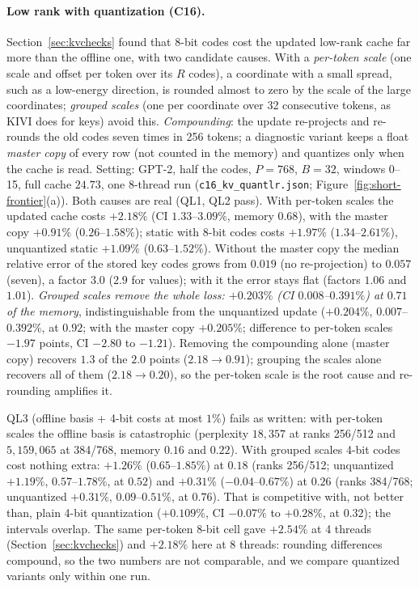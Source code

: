 \documentclass[10pt]{article}
\theoremstyle{plain}
\theoremstyle{definition}
\theoremstyle{remark}
\newcommand{\rl}[1]{\textsf{#1}}%
\begin{document}
\paragraph{Low rank with quantization (C16).} Section~\ref{sec:kvchecks} found that 8-bit codes cost the updated low-rank cache far more than the offline one, with two candidate causes. With a \emph{per-token scale} (one scale and offset per token over its $R$ codes), a coordinate with a small spread, such as a low-energy direction, is rounded almost to zero by the scale of the large coordinates; \emph{grouped scales} (one per coordinate over 32 consecutive tokens, as KIVI \cite{liu2024kivi} does for keys) avoid this. \emph{Compounding}: the update re-projects and re-rounds the old codes seven times in 256 tokens; a diagnostic variant keeps a float \emph{master copy} of every row (not counted in the memory) and quantizes only when the cache is read. Setting: GPT-2, half the codes, $P=768$, $B=32$, windows 0--15, full cache $24.73$, one 8-thread run (\texttt{c16\_kv\_quantlr.json}; Figure~\ref{fig:short-frontier}(a)). Both causes are real (\rl{QL1}, \rl{QL2} pass). With per-token scales the updated cache costs $+2.18\%$ (CI $1.33$--$3.09\%$, memory $0.68$), with the master copy $+0.91\%$ ($0.26$--$1.58\%$); static with 8-bit codes costs $+1.97\%$ ($1.34$--$2.61\%$), unquantized static $+1.09\%$ ($0.63$--$1.52\%$). Without the master copy the median relative error of the stored key codes grows from $0.019$ (no re-projection) to $0.057$ (seven), a factor $3.0$ ($2.9$ for values); with it the error stays flat (factors $1.06$ and $1.01$). \emph{Grouped scales remove the whole loss: $+0.203\%$ (CI $0.008$--$0.391\%$) at $0.71$ of the memory}, indistinguishable from the unquantized update ($+0.204\%$, $0.007$--$0.392\%$, at $0.92$; with the master copy $+0.205\%$; difference to per-token scales $-1.97$ points, CI $-2.80$ to $-1.21$). Removing the compounding alone (master copy) recovers $1.3$ of the $2.0$ points ($2.18\to0.91$); grouping the scales alone recovers all of them ($2.18\to0.20$), so the per-token scale is the root cause and re-rounding amplifies it.

\rl{QL3} (offline basis + 4-bit costs at most $1\%$) fails as written: with per-token scales the offline basis is catastrophic (perplexity $18{,}357$ at ranks 256/512 and $5{,}159{,}065$ at 384/768, memory $0.16$ and $0.22$). With grouped scales 4-bit codes cost nothing extra: $+1.26\%$ ($0.65$--$1.85\%$) at $0.18$ (ranks 256/512; unquantized $+1.19\%$, $0.57$--$1.78\%$, at $0.52$) and $+0.31\%$ ($-0.04$--$0.67\%$) at $0.26$ (ranks 384/768; unquantized $+0.31\%$, $0.09$--$0.51\%$, at $0.76$). That is competitive with, not better than, plain 4-bit quantization ($+0.109\%$, CI $-0.07\%$ to $+0.28\%$, at $0.32$); the intervals overlap. The same per-token 8-bit cell gave $+2.54\%$ at 4 threads (Section~\ref{sec:kvchecks}) and $+2.18\%$ here at 8 threads: rounding differences compound, so the two numbers are not comparable, and we compare quantized variants only within one run.
\end{document}
